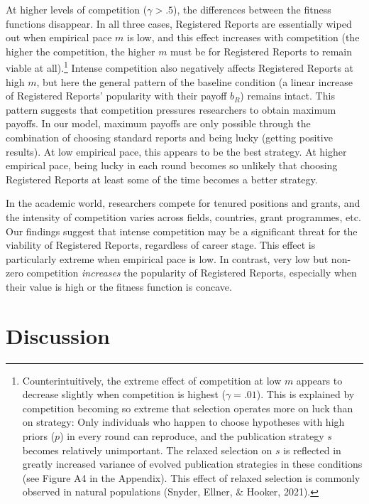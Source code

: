 \documentclass[
  british,
  a4paper,
  ,man,mask,floatsintext]{apa6}
\begin{document}
At higher levels of competition (\(\gamma > .5\)), the differences between the fitness functions disappear.
In all three cases, Registered Reports are essentially wiped out when empirical pace \(m\) is low, and this effect increases with competition (the higher the competition, the higher \(m\) must be for Registered Reports to remain viable at all).\footnote{Counterintuitively, the extreme effect of competition at low \(m\) appears to decrease slightly when competition is highest (\(\gamma = .01\)). This is explained by competition becoming so extreme that selection operates more on luck than on strategy: Only individuals who happen to choose hypotheses with high priors (\(p\)) in every round can reproduce, and the publication strategy \(s\) becomes relatively unimportant. The relaxed selection on \(s\) is reflected in greatly increased variance of evolved publication strategies in these conditions (see Figure A4 in the Appendix). This effect of relaxed selection is commonly observed in natural populations (Snyder, Ellner, \& Hooker, 2021).}
Intense competition also negatively affects Registered Reports at high \(m\), but here the general pattern of the baseline condition (a linear increase of Registered Reports' popularity with their payoff \(b_{R}\)) remains intact.
This pattern suggests that competition pressures researchers to obtain maximum payoffs.
In our model, maximum payoffs are only possible through the combination of choosing standard reports and being lucky (getting positive results).
At low empirical pace, this appears to be the best strategy.
At higher empirical pace, being lucky in each round becomes so unlikely that choosing Registered Reports at least some of the time becomes a better strategy.

In the academic world, researchers compete for tenured positions and grants, and the intensity of competition varies across fields, countries, grant programmes, etc.
Our findings suggest that intense competition may be a significant threat for the viability of Registered Reports, regardless of career stage.
This effect is particularly extreme when empirical pace is low.
In contrast, very low but non-zero competition \emph{increases} the popularity of Registered Reports, especially when their value is high or the fitness function is concave.

\section{Discussion}\label{discussion}
\end{document}
